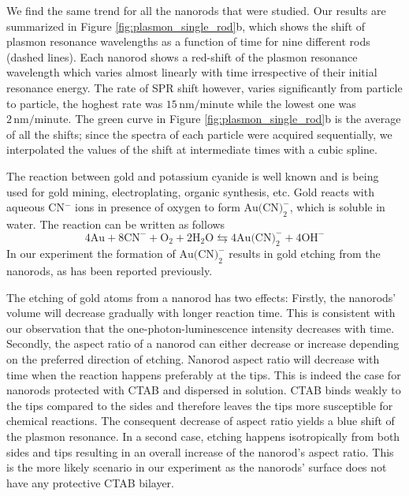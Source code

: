 \documentclass[a4paper,oneside,onecolumn]{article}
\newcommand{\nm}{\ensuremath{\,\textrm{nm}}}
\begin{document}
We find the same trend for all the nanorods that were studied. Our results are
summarized in Figure \ref{fig:plasmon_single_rod}b, which shows the shift of
plasmon resonance wavelengths as a function of time for nine different rods
(dashed lines). Each nanorod shows a red-shift of the plasmon resonance
wavelength which varies almost linearly with time irrespective of their
initial resonance energy. The rate of SPR shift however, varies significantly
from particle to particle, the hoghest rate was $15\nm/\textrm{minute}$
while the lowest one was $2\nm/\textrm{minute}$. The green curve in Figure
\ref{fig:plasmon_single_rod}b is the average of all the shifts; since the
spectra of each particle were acquired sequentially, we interpolated the
values of the shift at intermediate times with a cubic spline.

The reaction between gold and potassium cyanide is well known and is being used
for gold mining, electroplating, organic synthesis, etc. Gold reacts with
aqueous CN$^-$ ions in presence of oxygen to form $\textrm{Au(CN)}_2^-$, which
is soluble in water. The reaction can be written as follows
\begin{equation*}
4\textrm{Au} + 8\textrm{CN}^-+\textrm{O}_2 + 2\textrm{H}_2\textrm{O}
\leftrightarrows 4\textrm{Au(CN)}_2^-+4\textrm{OH}^- \end{equation*} 
In our experiment the formation of $\textrm{Au(CN)}_2^-$ results in gold etching from the nanorods, as has been reported previously\cite{Jana2002}.

The etching of gold atoms from a nanorod has two effects: Firstly, the
nanorods' volume will decrease gradually with longer reaction time. This is
consistent with our observation that the one-photon-luminescence intensity
decreases with time. Secondly, the aspect ratio of a nanorod can either
decrease or increase depending on the preferred direction of etching.
Nanorod aspect ratio will decrease with time when the reaction happens
preferably at the tips. This is indeed the case for nanorods protected with
CTAB and dispersed in solution\cite{Jana2002}. CTAB binds weakly to the tips
compared to the sides and therefore leaves the tips more susceptible for
chemical reactions\cite{Caswell2003}. The consequent decrease of aspect ratio
yields a blue shift of the plasmon resonance\cite{Link1999}. In a second case,
etching happens isotropically from both sides and tips resulting in an overall
increase of the nanorod's aspect ratio. This is the more likely scenario in
our experiment as the nanorods' surface does not have any protective CTAB bilayer.
\end{document}
